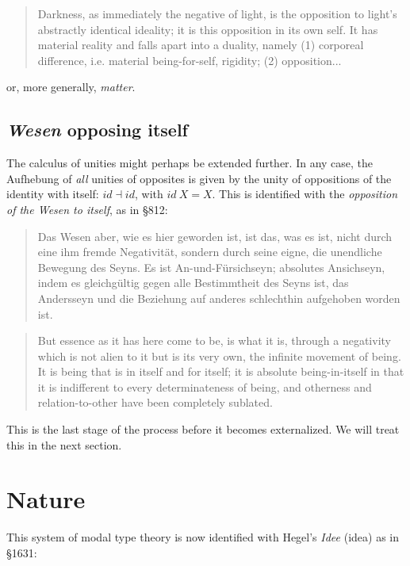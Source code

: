 \documentclass{article}
\begin{document}
\begin{quote}
    Darkness, as immediately the negative of light, is the opposition to light’s abstractly identical
ideality; it is this opposition in its own self. It has material reality and falls apart into a duality,
namely (1) corporeal difference, i.e. material being-for-self, rigidity; (2) opposition...
\end{quote}

or, more generally, \emph{matter}.


\subsection{\emph{Wesen} opposing itself}\label{Wesen}
The calculus of unities might perhaps be extended further. In any case, the Aufhebung of \emph{all} unities
of opposites is given by the unity of oppositions of the identity with itself: $id\dashv id$, with $id\
X=X$. This is identified with the \emph{opposition of the \emph{Wesen} to itself}, as in §812:

\begin{quote}
    Das Wesen aber, wie es hier geworden ist, ist das, was es ist, nicht durch eine ihm fremde Negativität,
sondern durch seine eigne, die unendliche Bewegung des Seyns. Es ist An-und-Fürsichseyn; absolutes Ansichseyn,
indem es gleichgültig gegen alle Bestimmtheit des Seyns ist, das Andersseyn und die Beziehung auf anderes
schlechthin aufgehoben worden ist.
\end{quote}

\begin{quote}
    But essence as it has here come to be, is what it is, through a negativity which is not alien to it
but is its very own, the infinite movement of being. It is being that is in itself and for itself; it
is absolute being-in-itself in that it is indifferent to every determinateness of being, and otherness
and relation-to-other have been completely sublated.
\end{quote}

This is the last stage of the process before it becomes externalized. We will treat this in the next section.



\section{Nature}
This system of modal type theory is now identified with Hegel's \emph{Idee} (idea) as in §1631:
\end{document}
